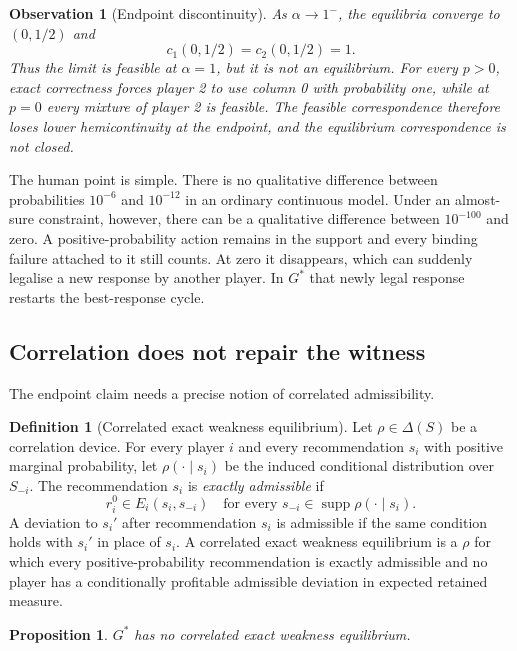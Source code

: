 \documentclass[11pt]{article}
\newtheorem{proposition}[theorem]{Proposition}
\newtheorem{observation}[theorem]{Observation}
\theoremstyle{definition}
\newtheorem{definition}[theorem]{Definition}
\newcommand{\supp}{\operatorname{supp}}
\begin{document}
\begin{observation}[Endpoint discontinuity]\label{obs:discontinuity}
As $\alpha\to1^-$, the equilibria converge to $(0,1/2)$ and
\[
c_1(0,1/2)=c_2(0,1/2)=1.
\]
Thus the limit is feasible at $\alpha=1$, but it is not an equilibrium. For every $p>0$, exact correctness forces player 2 to use column 0 with probability one, while at $p=0$ every mixture of player 2 is feasible. The feasible correspondence therefore loses lower hemicontinuity at the endpoint, and the equilibrium correspondence is not closed.
\end{observation}

The human point is simple. There is no qualitative difference between probabilities $10^{-6}$ and $10^{-12}$ in an ordinary continuous model. Under an almost-sure constraint, however, there can be a qualitative difference between $10^{-100}$ and zero. A positive-probability action remains in the support and every binding failure attached to it still counts. At zero it disappears, which can suddenly legalise a new response by another player. In $G^*$ that newly legal response restarts the best-response cycle.

\subsection{Correlation does not repair the witness}
The endpoint claim needs a precise notion of correlated admissibility.

\begin{definition}[Correlated exact weakness equilibrium]
Let $\rho\in\Delta(S)$ be a correlation device. For every player $i$ and every recommendation $s_i$ with positive marginal probability, let $\rho(\cdot\mid s_i)$ be the induced conditional distribution over $S_{-i}$. The recommendation $s_i$ is \emph{exactly admissible} if
\[
r_i^0\in E_i(s_i,s_{-i})
\quad\text{for every }s_{-i}\in\supp\rho(\cdot\mid s_i).
\]
A deviation to $s_i'$ after recommendation $s_i$ is admissible if the same condition holds with $s_i'$ in place of $s_i$. A correlated exact weakness equilibrium is a $\rho$ for which every positive-probability recommendation is exactly admissible and no player has a conditionally profitable admissible deviation in expected retained measure.
\end{definition}

\begin{proposition}\label{prop:correlated}
$G^*$ has no correlated exact weakness equilibrium.
\end{proposition}
\end{document}
